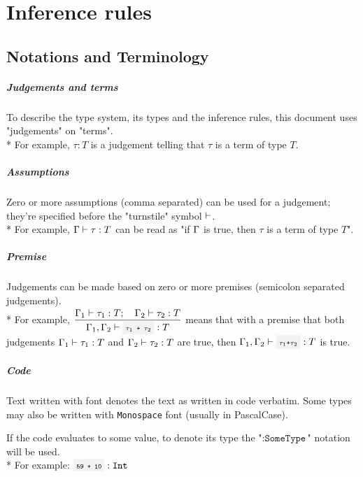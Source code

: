 \chapter{Inference rules}

\section{Notations and Terminology}

\paragraph{Judgements and terms} To describe the type system, its types and
the inference rules, this document uses "judgements" on "terms".\\*
For example, $\tau:T$ is a judgement telling that $\tau$ is a term of type $T$.

\paragraph{Assumptions} Zero or more assumptions (comma separated) can be
used for a judgement; they're specified before the "turnstile" symbol
$\vdash$.\\*
For example, $\Gamma \vdash \tau:T$ can be read as "if $\Gamma$ is true, then
$\tau$ is a term of type $T$".

\paragraph{Premise} Judgements can be made based on zero or more premises
(semicolon separated judgements).\\*
For example, $\infrule{\EnvSym_1\then\tau_1:T\semiq\EnvSym_2\then\tau_2:T}{
\EnvSym_1,\EnvSym_2\then \code{$\tau_1$ + $\tau_2$}: T}$ means that with a
premise that both judgements $\Gamma_1\vdash\tau_1:T$ and
$\Gamma_2\vdash\tau_2:T$ are true, then
$\EnvSym_1,\EnvSym_2\then\code{$\tau_1$+$\tau_2$}:T$ is true.

\paragraph{Code} Text written with  font denotes the text
as written in code verbatim. Some types may also be written with
\texttt{Monospace} font (usually in PascalCase).

If the code evaluates to some value, to denote its type the
"$:\texttt{SomeType}$" notation will be used.\\*
For example: $\code{59 + 10} : \Int$

